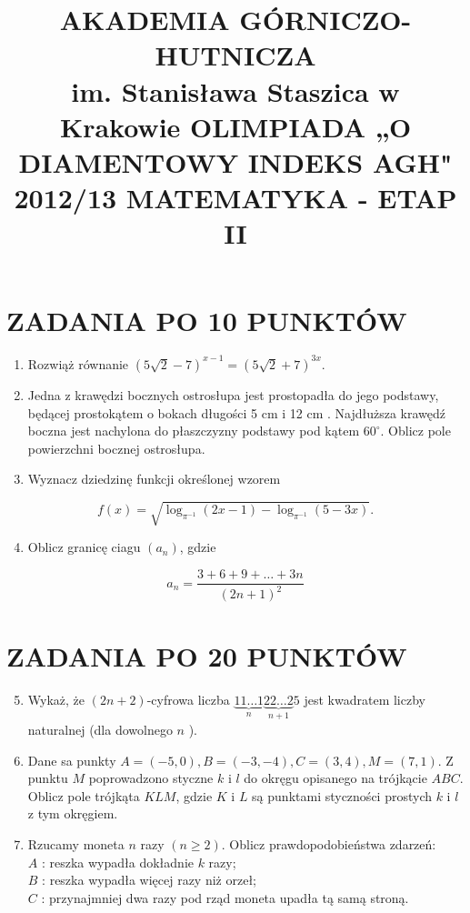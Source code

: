 \documentclass[10pt]{article}
\title{AKADEMIA GÓRNICZO-HUTNICZA \\
 im. Stanisława Staszica w Krakowie OLIMPIADA „O DIAMENTOWY INDEKS AGH" 2012/13 MATEMATYKA - ETAP II }
\author{}
\date{}
\begin{document}
\maketitle
\section*{ZADANIA PO 10 PUNKTÓW}
\begin{enumerate}
  \item Rozwiąż równanie $(5 \sqrt{2}-7)^{x-1}=(5 \sqrt{2}+7)^{3 x}$.
  \item Jedna z krawędzi bocznych ostrosłupa jest prostopadła do jego podstawy, będącej prostokątem o bokach długości 5 cm i 12 cm . Najdłuższa krawędź boczna jest nachylona do płaszczyzny podstawy pod kątem $60^{\circ}$. Oblicz pole powierzchni bocznej ostrosłupa.
  \item Wyznacz dziedzinę funkcji określonej wzorem
\end{enumerate}

$$
f(x)=\sqrt{\log _{\pi^{-1}}(2 x-1)-\log _{\pi^{-1}}(5-3 x)} .
$$

\begin{enumerate}
  \setcounter{enumi}{3}
  \item Oblicz granicę ciagu $\left(a_{n}\right)$, gdzie
\end{enumerate}

$$
a_{n}=\frac{3+6+9+\ldots+3 n}{(2 n+1)^{2}}
$$

\section*{ZADANIA PO 20 PUNKTÓW}
\begin{enumerate}
  \setcounter{enumi}{4}
  \item Wykaż, że $(2 n+2)$-cyfrowa liczba $\underbrace{11 \ldots 1}_{n} \underbrace{22 \ldots 2}_{n+1} 5$ jest kwadratem liczby naturalnej (dla dowolnego $n$ ).
  \item Dane sa punkty $A=(-5,0), B=(-3,-4), C=(3,4), M=(7,1)$. Z punktu $M$ poprowadzono styczne $k$ i $l$ do okręgu opisanego na trójkącie $A B C$. Oblicz pole trójkąta $K L M$, gdzie $K$ i $L$ są punktami styczności prostych $k$ i $l$ z tym okręgiem.
  \item Rzucamy moneta $n$ razy $(n \geq 2)$. Oblicz prawdopodobieństwa zdarzeń:\\
$A$ : reszka wypadła dokładnie $k$ razy;\\
$B$ : reszka wypadła więcej razy niż orzeł;\\
$C$ : przynajmniej dwa razy pod rząd moneta upadła tą samą stroną.
\end{enumerate}
\end{document}
